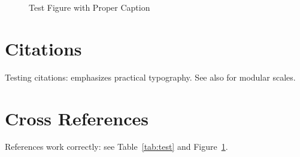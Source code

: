 \documentclass[11pt]{article}
\begin{document}
\begin{figure}[tbp]
  \centering
  \caption{Test Figure with Proper Caption}
  \label{fig:test}
\end{figure}

\section{Citations}

Testing citations: \cite{butterick2019practical} emphasizes practical typography. 
See also \cite{brown2018flexible} for modular scales.

\FloatBarrier

\section{Cross References}

References work correctly: see Table~\ref{tab:test} and Figure~\ref{fig:test}.

\printbibliography
\end{document}
